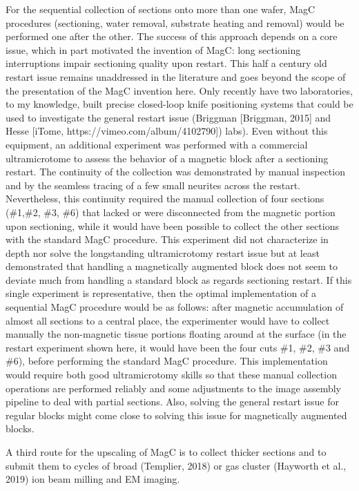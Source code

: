 \documentclass{article}
\begin{document}
For the sequential collection of sections onto more than one wafer, MagC procedures (sectioning, water removal, substrate heating and removal) would be performed one after the other. The success of this approach depends on a core issue, which in part motivated the invention of MagC: long sectioning interruptions impair sectioning quality upon restart. This half a century old restart issue remains unaddressed in the literature and goes beyond the scope of the presentation of the MagC invention here. Only recently have two laboratories, to my knowledge, built precise closed-loop knife positioning systems that could be used to investigate the general restart issue (Briggman [Briggman, 2015] and Hesse [iTome, https://vimeo.com/album/4102790]) labs). Even without this equipment, an additional experiment was performed with a commercial ultramicrotome to assess the behavior of a magnetic block after a sectioning restart. The continuity of the collection was demonstrated by manual inspection and by the seamless tracing of a few small neurites across the restart. Nevertheless, this continuity required the manual collection of four sections (\#1,\#2, \#3, \#6) that lacked or were disconnected from the magnetic portion upon sectioning, while it would have been possible to collect the other sections with the standard MagC procedure. This experiment did not characterize in depth nor solve the longstanding ultramicrotomy restart issue but at least demonstrated that handling a magnetically augmented block does not seem to deviate much from handling a standard block as regards sectioning restart. If this single experiment is representative, then the optimal implementation of a sequential MagC procedure would be as follows: after magnetic accumulation of almost all sections to a central place, the experimenter would have to collect manually the non-magnetic tissue portions floating around at the surface (in the restart experiment shown here, it would have been the four cuts \#1, \#2, \#3 and \#6), before performing the standard MagC procedure. This implementation would require both good ultramicrotomy skills so that these manual collection operations are performed reliably and some adjustments to the image assembly pipeline to deal with partial sections. Also, solving the general restart issue for regular blocks might come close to solving this issue for magnetically augmented blocks.

A third route for the upscaling of MagC is to collect thicker sections and to submit them to cycles of broad (Templier, 2018) or gas cluster (Hayworth et al., 2019) ion beam milling and EM imaging.
\end{document}
